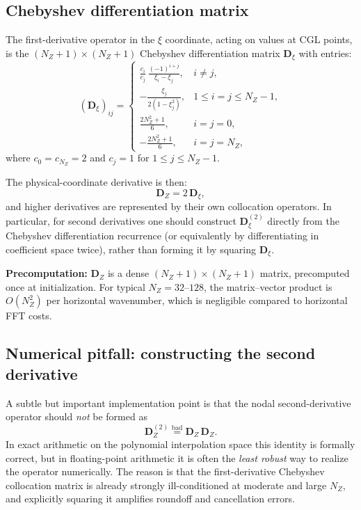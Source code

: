 \documentclass[11pt]{article}
\newcommand{\Dvec}{\bm{D}}
\begin{document}
\subsection{Chebyshev differentiation matrix}
\label{sec:diffmat}

The first-derivative operator in the $\xi$ coordinate, acting on values at CGL points, is the $(N_Z+1) \times (N_Z+1)$ Chebyshev differentiation matrix $\Dvec_\xi$ with entries:
\begin{equation}
(\Dvec_\xi)_{ij} = \begin{cases}
\displaystyle\frac{c_i}{c_j}\,\frac{(-1)^{i+j}}{\xi_i - \xi_j}, & i \ne j,\\[8pt]
\displaystyle -\frac{\xi_j}{2(1-\xi_j^2)}, & 1 \le i = j \le N_Z - 1,\\[8pt]
\displaystyle \frac{2N_Z^2 + 1}{6}, & i = j = 0,\\[8pt]
\displaystyle -\frac{2N_Z^2 + 1}{6}, & i = j = N_Z,
\end{cases}
\label{eq:cheb_diffmat}
\end{equation}
where $c_0 = c_{N_Z} = 2$ and $c_j = 1$ for $1 \le j \le N_Z - 1$.

The physical-coordinate derivative is then:
\begin{equation}
\Dvec_Z = 2\,\Dvec_\xi,
\label{eq:DZ}
\end{equation}
and higher derivatives are represented by their own collocation operators. In particular, for second derivatives one should construct $\Dvec_\xi^{(2)}$ directly from the Chebyshev differentiation recurrence (or equivalently by differentiating in coefficient space twice), rather than forming it by squaring $\Dvec_\xi$.

\textbf{Precomputation:} $\Dvec_Z$ is a dense $(N_Z+1)\times(N_Z+1)$ matrix, precomputed once at initialization. For typical $N_Z = 32$--$128$, the matrix--vector product is $O(N_Z^2)$ per horizontal wavenumber, which is negligible compared to horizontal FFT costs.

\subsection{Numerical pitfall: constructing the second derivative}
\label{sec:d2_pitfall}

A subtle but important implementation point is that the nodal second-derivative operator should \emph{not} be formed as
\begin{equation}
\Dvec_Z^{(2)} \stackrel{\mathrm{bad}}{=} \Dvec_Z\,\Dvec_Z.
\end{equation}
In exact arithmetic on the polynomial interpolation space this identity is formally correct, but in floating-point arithmetic it is often the \emph{least robust} way to realize the operator numerically. The reason is that the first-derivative Chebyshev collocation matrix is already strongly ill-conditioned at moderate and large $N_Z$, and explicitly squaring it amplifies roundoff and cancellation errors.
\end{document}
